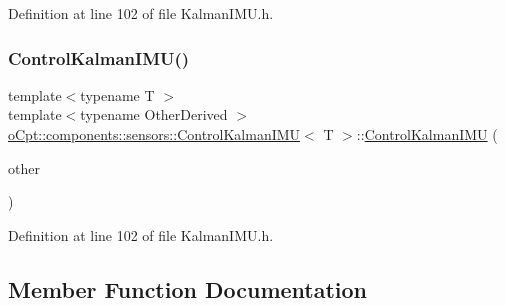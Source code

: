 Definition at line 102 of file Kalman\+I\+M\+U.\+h.

\hypertarget{classo_cpt_1_1components_1_1sensors_1_1_control_kalman_i_m_u_a49168d8285a50e490574a582811fabf8}{}\label{classo_cpt_1_1components_1_1sensors_1_1_control_kalman_i_m_u_a49168d8285a50e490574a582811fabf8} 
\subsubsection{\texorpdfstring{Control\+Kalman\+I\+M\+U()}{ControlKalmanIMU()}\hspace{0.1cm}{\footnotesize\ttfamily [2/2]}}
{\footnotesize\ttfamily template$<$typename T $>$ \\
template$<$typename Other\+Derived $>$ \\
\hyperlink{classo_cpt_1_1components_1_1sensors_1_1_control_kalman_i_m_u}{o\+Cpt\+::components\+::sensors\+::\+Control\+Kalman\+I\+MU}$<$ T $>$\+::\hyperlink{classo_cpt_1_1components_1_1sensors_1_1_control_kalman_i_m_u}{Control\+Kalman\+I\+MU} (\begin{DoxyParamCaption}\item[{const Eigen\+::\+Matrix\+Base$<$ Other\+Derived $>$ \&}]{other }\end{DoxyParamCaption})\hspace{0.3cm}{\ttfamily [inline]}}



Definition at line 102 of file Kalman\+I\+M\+U.\+h.



\subsection{Member Function Documentation}
\hypertarget{classo_cpt_1_1components_1_1sensors_1_1_control_kalman_i_m_u_a56e78cc546a77e97ff1e1a1605d8cf30}{}\label{classo_cpt_1_1components_1_1sensors_1_1_control_kalman_i_m_u_a56e78cc546a77e97ff1e1a1605d8cf30} 

